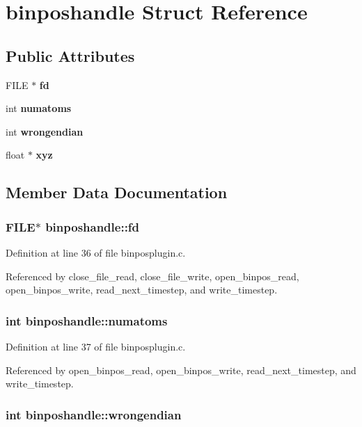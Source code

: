 \section{binposhandle  Struct Reference}
\label{structbinposhandle}
\subsection*{Public Attributes}
\begin{CompactItemize}
\item 
FILE $\ast$ {\bf fd}
\item 
int {\bf numatoms}
\item 
int {\bf wrongendian}
\item 
float $\ast$ {\bf xyz}
\end{CompactItemize}


\subsection{Member Data Documentation}
\subsubsection{\setlength{\rightskip}{0pt plus 5cm}FILE$\ast$ binposhandle::fd}\label{structbinposhandle_m0}




Definition at line 36 of file binposplugin.c.

Referenced by close\_\-file\_\-read, close\_\-file\_\-write, open\_\-binpos\_\-read, open\_\-binpos\_\-write, read\_\-next\_\-timestep, and write\_\-timestep.
\subsubsection{\setlength{\rightskip}{0pt plus 5cm}int binposhandle::numatoms}\label{structbinposhandle_m1}




Definition at line 37 of file binposplugin.c.

Referenced by open\_\-binpos\_\-read, open\_\-binpos\_\-write, read\_\-next\_\-timestep, and write\_\-timestep.
\subsubsection{\setlength{\rightskip}{0pt plus 5cm}int binposhandle::wrongendian}\label{structbinposhandle_m2}




